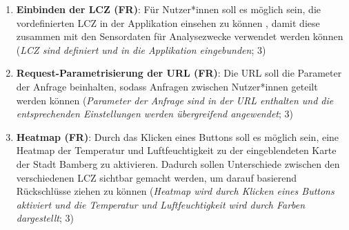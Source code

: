 \begin{enumerate}
    \item \textbf{Einbinden der \ac{LCZ} (\ac{FR})}: Für Nutzer*innen soll es möglich sein, die vordefinierten \ac{LCZ} in der Applikation einsehen zu können , damit diese zusammen mit den Sensordaten für Analysezwecke verwendet werden können (\textit{\ac{LCZ} sind definiert und in die Applikation eingebunden}; 3)
    \item \textbf{Request-Parametrisierung der URL (\ac{FR})}: Die URL soll die Parameter der Anfrage beinhalten, sodass Anfragen zwischen Nutzer*innen geteilt werden können (\textit{Parameter der Anfrage sind in der URL enthalten und die entsprechenden Einstellungen werden übergreifend angewendet}; 3)
    \item \textbf{Heatmap (\ac{FR})}: Durch das Klicken eines Buttons soll es möglich sein, eine Heatmap der Temperatur und Luftfeuchtigkeit zu der eingeblendeten Karte der Stadt Bamberg zu aktivieren. Dadurch sollen Unterschiede zwischen den verschiedenen \ac{LCZ} sichtbar gemacht werden, um darauf basierend Rückschlüsse ziehen zu können (\textit{Heatmap wird durch Klicken eines Buttons aktiviert und die Temperatur und Luftfeuchtigkeit wird durch Farben dargestellt}; 3)
    

\end{enumerate}
